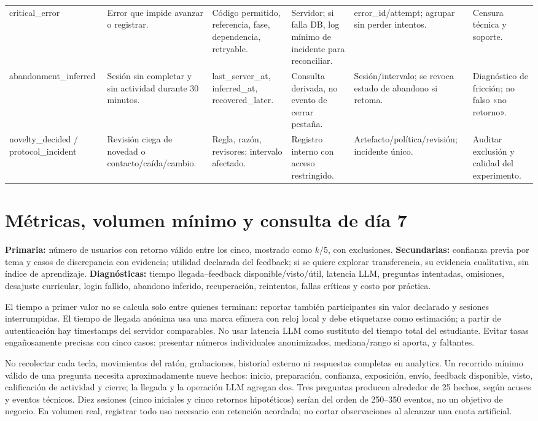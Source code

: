 \documentclass[11pt,a4paper]{report}
\begin{document}
\begin{landscape}
\begin{longtable}{P{3.4cm}P{4.2cm}P{4.3cm}P{3.7cm}P{4.6cm}P{3.2cm}}
critical\_error & Error que impide avanzar o registrar. & Código permitido, referencia, fase, dependencia, retryable. & Servidor; si falla DB, log mínimo de incidente para reconciliar. & error\_id/attempt; agrupar sin perder intentos. & Censura técnica y soporte.\\
abandonment\_inferred & Sesión sin completar y sin actividad durante 30 minutos. & last\_server\_at, inferred\_at, recovered\_later. & Consulta derivada, no evento de cerrar pestaña. & Sesión/intervalo; se revoca estado de abandono si retoma. & Diagnóstico de fricción; no falso «no retorno».\\
novelty\_decided / protocol\_incident & Revisión ciega de novedad o contacto/caída/cambio. & Regla, razón, revisores; intervalo afectado. & Registro interno con acceso restringido. & Artefacto/política/revisión; incidente único. & Auditar exclusión y calidad del experimento.\\\bottomrule
\end{longtable}
\end{landscape}

\section{Métricas, volumen mínimo y consulta de día 7}
\textbf{Primaria:} número de usuarios con retorno válido entre los cinco, mostrado como \(k/5\), con exclusiones. \textbf{Secundarias:} confianza previa por tema y casos de discrepancia con evidencia; utilidad declarada del feedback; si se quiere explorar transferencia, su evidencia cualitativa, sin índice de aprendizaje. \textbf{Diagnósticas:} tiempo llegada--feedback disponible/visto/útil, latencia LLM, preguntas intentadas, omisiones, desajuste curricular, login fallido, abandono inferido, recuperación, reintentos, fallas críticas y costo por práctica.

El tiempo a primer valor no se calcula solo entre quienes terminan: reportar también participantes sin valor declarado y sesiones interrumpidas. El tiempo de llegada anónima usa una marca efímera con reloj local y debe etiquetarse como estimación; a partir de autenticación hay timestamps del servidor comparables. No usar latencia LLM como sustituto del tiempo total del estudiante. Evitar tasas engañosamente precisas con cinco casos: presentar números individuales anonimizados, mediana/rango si aporta, y faltantes.

No recolectar cada tecla, movimientos del ratón, grabaciones, historial externo ni respuestas completas en analytics. Un recorrido mínimo válido de una pregunta necesita aproximadamente nueve hechos: inicio, preparación, confianza, exposición, envío, feedback disponible, visto, calificación de actividad y cierre; la llegada y la operación LLM agregan dos. Tres preguntas producen alrededor de 25 hechos, según acuses y eventos técnicos. Diez sesiones (cinco iniciales y cinco retornos hipotéticos) serían del orden de 250--350 eventos, no un objetivo de negocio. En volumen real, registrar todo uso necesario con retención acordada; no cortar observaciones al alcanzar una cuota artificial.
\end{document}
